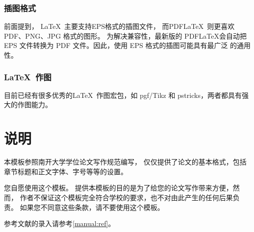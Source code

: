 \subsection{插图格式}

前面提到， \LaTeX\ 主要支持EPS格式的插图文件， 而PDF\LaTeX\ 则更喜欢 PDF、PNG、JPG 格式的图形。
为解决兼容性，最新版的 PDF\LaTeX 会自动把 EPS 文件转换为 PDF 文件。因此，使用 EPS 格式的插图可能具有最广泛
的通用性。

\subsection{\LaTeX\ 作图}

目前已经有很多优秀的\LaTeX\ 作图宏包，如 pgf/Tikz 和 pstricks，两者都具有强大的作图能力。

\chapter{说明}



本模板参照南开大学学位论文写作规范编写，
仅仅提供了论文的基本格式，包括章节标题和正文字体、字号等等的设置。



您自愿使用这个模板。
提供本模板的目的是为了给您的论文写作带来方便，然而，
作者不保证这个模板完全符合学校的要求，也不对由此产生的任何后果负责。
如果您不同意这些条款，请不要使用这个模板。


参考文献的录入请参考\ref{manual:ref}。

%
\renewcommand{\bibname}{参考文献}


